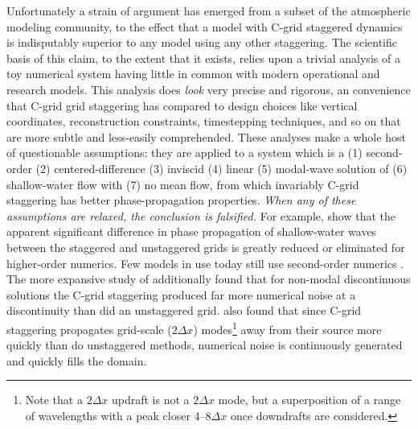 \documentclass[10pt,letterpaper,margin=1in]{memoir}
\begin{document}
Unfortunately a strain of argument has emerged from a subset of the atmospheric modeling community, to the effect that a model with C-grid staggered dynamics is indisputably superior to any model using any other staggering. The scientific basis of this claim, to the extent that it exists, relies upon a trivial analysis of a toy numerical system having little in common with modern operational and research models. This analysis does \textit{look} very precise and rigorous, an convenience that C-grid grid staggering has compared to design choices like vertical coordinates, reconstruction constraints, timestepping techniques, and so on that are more subtle and less-easily comprehended. These analyses make a whole host of questionable assumptions: they are applied to a system which is a (1) second-order (2) centered-difference (3) inviscid (4) linear (5) modal-wave solution of (6) shallow-water flow with (7) no mean flow, from which invariably C-grid staggering has better phase-propagation properties. \textit{When any of these assumptions are relaxed, the conclusion is falsified.} For example, \citet{xu2021properties} %
show that the apparent significant difference in phase propagation of shallow-water waves between the staggered and unstaggered grids is greatly reduced or eliminated for higher-order numerics. Few models in use today still use second-order numerics \citep{ullrich2017}. The more expansive study of \citet{XChen2018} additionally found that for non-modal discontinuous solutions the C-grid staggering produced far more numerical noise at a discontinuity than did an unstaggered grid. \citet{XChen2018} also found that since C-grid staggering propagates grid-scale ($2\Delta x$) modes\footnote{Note that a $2\Delta x$ updraft is not a $2\Delta x$ mode, but a superposition of a range of wavelengths with a peak closer 4--8$\Delta x$ once downdrafts are considered.} away from their source more quickly than do unstaggered methods, numerical noise is continuously generated and quickly fills the domain.
\end{document}
